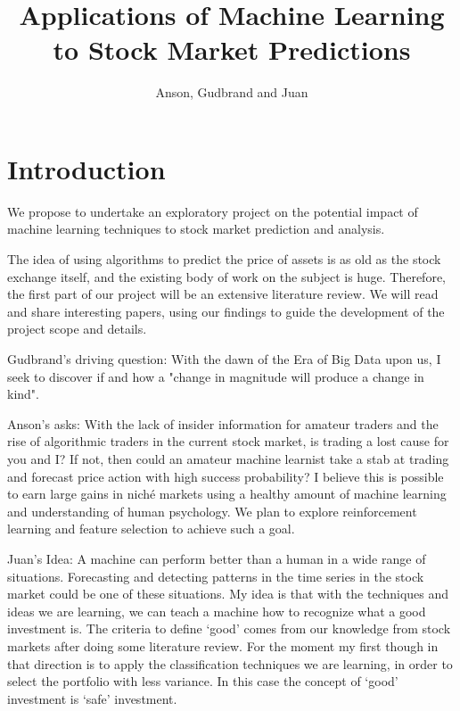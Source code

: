 \documentclass[12pt, oneside]{article}
\title{Applications of Machine Learning to Stock Market Predictions}
\author{Anson, Gudbrand and Juan}
\def\blu#1{{\color{blu}#1}}
\begin{document}
\maketitle

\section{Introduction}

We propose to undertake an exploratory project on the potential impact of machine learning techniques to stock market prediction and analysis. 

The idea of using algorithms to predict the price of assets is as old as the stock exchange itself, and the existing body of work on the subject is huge. Therefore, the first part of our project will be an extensive literature review. We will read and share interesting papers, using our findings to guide the development of the project scope and details.

\blu{Gudbrand's driving question:} With the dawn of the Era of Big Data upon us, I seek to discover if and how a "change in magnitude will produce a change in kind".

\blu{Anson's asks:} With the lack of insider information for amateur traders and the rise of algorithmic traders in the current stock market, is trading a lost cause for you and I? If not, then could an amateur machine learnist take a stab at trading and forecast price action with high success probability? I believe this is possible to earn large gains in nich\'{e} markets using a healthy amount of machine learning and understanding of human psychology. We plan to explore reinforcement learning and feature selection to achieve such a goal.

\blu{Juan's Idea:} A machine can perform better than a human in a wide range of situations. Forecasting and detecting patterns in the time series in the stock market could be one of these situations.
My idea is that with the techniques and ideas we are learning, we can teach a machine how to recognize what a good investment is. The criteria to define `good' comes from our knowledge 
from stock markets after doing some literature review. For the moment my first though in that direction is to apply the classification techniques we are learning,  in order to select the portfolio
with less variance. In this case the concept of `good' investment is `safe' investment.
\end{document}
